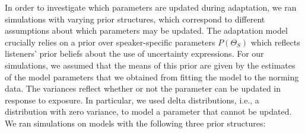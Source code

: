 \documentclass[man, floatsintext]{apa6}
\begin{document}
In order to investigate which parameters are updated during adaptation, we ran simulations
with varying prior structures, which correspond to different assumptions about which parameters may be updated.
The adaptation model crucially relies on a prior over speaker-specific parameters $P(\Theta_S)$
which reflects listeners' prior beliefs about the use of uncertainty expressions. For our simulations,
we assumed that the means of this prior are given by the estimates of the model parameters that 
we obtained from fitting the model to the norming data. The variances reflect whether or not the parameter can be updated in response to exposure. In particular, we used delta distributions, i.e., a distribution with zero variance, to model a parameter that cannot be updated. We ran simulations on models with the following three prior structures:
\end{document}
